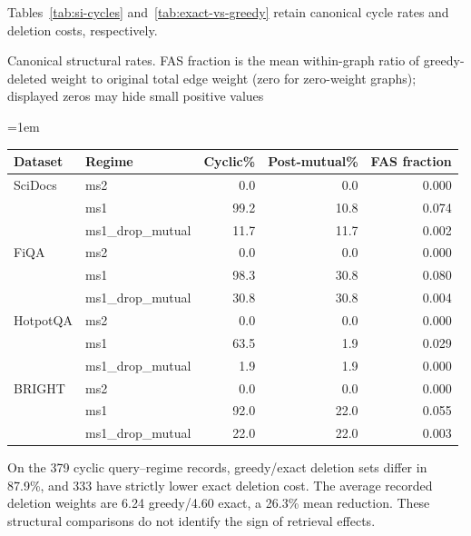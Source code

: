 \documentclass[pdflatex,sn-basic,Numbered]{sn-jnl}
\renewcommand{\papertable}{\small\renewcommand{\arraystretch}{1.15}\setlength{\tabcolsep}{4pt}\emergencystretch=1em}
\begin{document}
Tables~\ref{tab:si-cycles} and~\ref{tab:exact-vs-greedy} retain canonical cycle rates and deletion costs, respectively.
\begin{supplementtable}\caption{Canonical structural rates. FAS fraction is the mean within-graph ratio of greedy-deleted weight to original total edge weight (zero for zero-weight graphs); displayed zeros may hide small positive values}\label{tab:si-cycles}\papertable
\begin{tabularx}{\linewidth}{@{}lYrrr@{}}\toprule
Dataset&Regime&Cyclic\%&Post-mutual\%&FAS fraction\\\midrule
SciDocs&ms2&0.0&0.0&0.000\\
&ms1&99.2&10.8&0.074\\
&ms1\_drop\_mutual&11.7&11.7&0.002\\\addlinespace
FiQA&ms2&0.0&0.0&0.000\\
&ms1&98.3&30.8&0.080\\
&ms1\_drop\_mutual&30.8&30.8&0.004\\\addlinespace
HotpotQA&ms2&0.0&0.0&0.000\\
&ms1&63.5&1.9&0.029\\
&ms1\_drop\_mutual&1.9&1.9&0.000\\\addlinespace
BRIGHT&ms2&0.0&0.0&0.000\\
&ms1&92.0&22.0&0.055\\
&ms1\_drop\_mutual&22.0&22.0&0.003\\\bottomrule
\end{tabularx}\end{supplementtable}

On the 379 cyclic query--regime records, greedy/exact deletion sets differ in 87.9\%, and 333 have strictly lower exact deletion cost. The average recorded deletion weights are 6.24 greedy/4.60 exact, a 26.3\% mean reduction. These structural comparisons do not identify the sign of retrieval effects.
\end{document}
